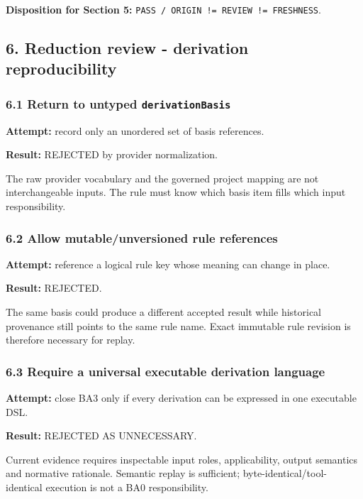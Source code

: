 \documentclass[11pt,a4paper]{article}
\begin{document}
\textbf{Disposition for Section 5:} \texttt{PASS\ /\ ORIGIN\ !=\ REVIEW\ !=\ FRESHNESS}.

\subsection{6. Reduction review - derivation reproducibility}\label{reduction-review---derivation-reproducibility}

\subsubsection{\texorpdfstring{6.1 Return to untyped \texttt{derivationBasis}}{6.1 Return to untyped derivationBasis}}\label{return-to-untyped-derivationbasis}

\textbf{Attempt:} record only an unordered set of basis references.

\textbf{Result:} REJECTED by provider normalization.

The raw provider vocabulary and the governed project mapping are not interchangeable inputs. The rule must know which basis item fills which input responsibility.

\subsubsection{6.2 Allow mutable/unversioned rule references}\label{allow-mutableunversioned-rule-references}

\textbf{Attempt:} reference a logical rule key whose meaning can change in place.

\textbf{Result:} REJECTED.

The same basis could produce a different accepted result while historical provenance still points to the same rule name. Exact immutable rule revision is therefore necessary for replay.

\subsubsection{6.3 Require a universal executable derivation language}\label{require-a-universal-executable-derivation-language}

\textbf{Attempt:} close BA3 only if every derivation can be expressed in one executable DSL.

\textbf{Result:} REJECTED AS UNNECESSARY.

Current evidence requires inspectable input roles, applicability, output semantics and normative rationale. Semantic replay is sufficient; byte-identical/tool-identical execution is not a BA0 responsibility.
\end{document}
